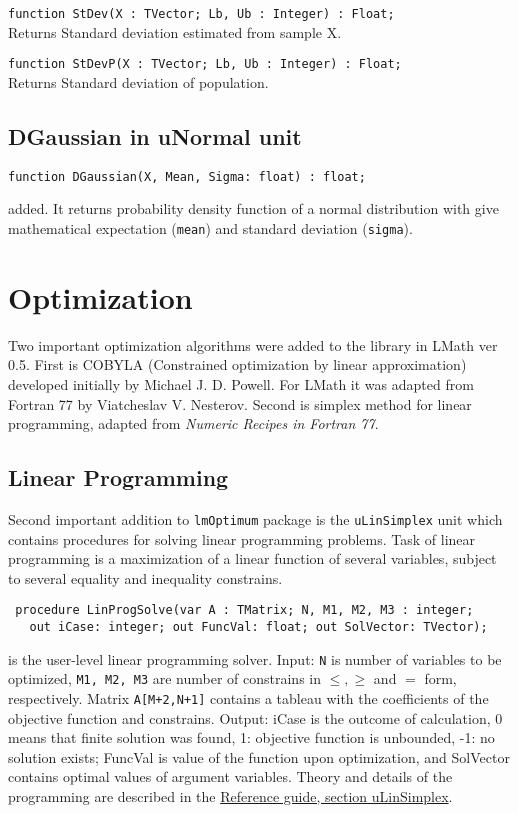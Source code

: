 \documentclass[12pt,a4paper,oneside]{article}
\newcommand{\code}[1]{\texttt{#1}}
\begin{document}
\code{function StDev(X : TVector; Lb, Ub : Integer) : Float;}\\ 
Returns Standard deviation estimated from sample X.

\code{function StDevP(X : TVector; Lb, Ub : Integer) : Float;} \\
Returns Standard deviation of population.
\subsection{DGaussian in uNormal unit}
\begin{verbatim}
function DGaussian(X, Mean, Sigma: float) : float;
\end{verbatim}\vspace{-6pt}
added. It returns probability density function of a normal distribution with give mathematical expectation (\code{mean}) and standard deviation (\code{sigma}).
\section{Optimization}
Two important optimization algorithms were added to the library in LMath ver 0.5. First is COBYLA (Constrained optimization by linear approximation) developed initially by Michael J. D. Powell. For LMath it was adapted from Fortran 77 by Viatcheslav V. Nesterov. Second is simplex method for linear programming, adapted from \textit{Numeric Recipes in Fortran 77}.

\subsection{Linear Programming}
Second important addition to \code{lmOptimum} package is the \code{uLinSimplex} unit which contains procedures for solving linear programming problems. Task of linear programming is a maximization of a linear function of several variables, subject to several equality and inequality constrains.
 \begin{verbatim}
 procedure LinProgSolve(var A : TMatrix; N, M1, M2, M3 : integer;
   out iCase: integer; out FuncVal: float; out SolVector: TVector);
\end{verbatim}\vspace{-6pt}
is the user-level linear programming solver.
Input: \code{N} is number of variables to be optimized, \code{M1, M2, M3} are number of constrains in $\leq,\geq$ and $=$ form, respectively. Matrix \code{A[M+2,N+1]} contains a tableau with the coefficients of the objective function and constrains. Output: iCase is the outcome of calculation, 0 means that finite solution was found, 1: objective function is unbounded, -1: no solution exists; FuncVal is value of the function upon optimization, and SolVector contains optimal values of argument variables. Theory and details of the programming are described in the 
\href{LMath0_5.pdf#lmoptimum.ulinsimplex}{Reference guide, section uLinSimplex}.
\end{document}

